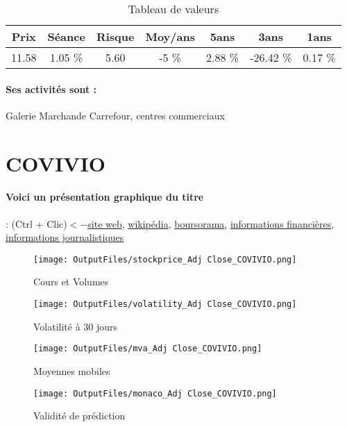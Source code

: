 \documentclass[11pt,a4paper]{report}%
\begin{document}
\begin{table}[H]
  \centering
    \begin{tabular}{|c|c|c|c|c|c|c|}
    \hline
    Prix & Séance & Risque  & Moy/ans & 5ans & 3ans & 1ans \\
    \hline
    11.58 &    1.05 \%    & 5.60 & -5 \% & 2.88 \% & -26.42 \% & 0.17 \% \\
    \hline
    \end{tabular}%
        \label{tab:table_CARMILA}%
      \caption{Tableau de valeurs}
\end{table}%

\paragraph{Ses activités sont : } Galerie Marchande Carrefour, centres commerciaux 
    
    \newpage

\section{COVIVIO}

\paragraph{Voici un présentation graphique du titre} : (Ctrl + Clic)$<-$\href{https://www.covivio.eu/fr/finance/investisseurs-et-actionnaires/}{site web}, \href{https://fr.wikipedia.org/wiki/Covivio}{wikipédia}, \href{https://www.boursorama.com/cours/1rPCOV}{boursorama}, \href{https://www.qwant.com/?q=site:https:%2f%2fwww.easybourse.com%2faction-societe%2fCOVIVIO&t=web&client=ext-firefox-hp}{informations financières}, \href{https://bourse.lerevenu.com/cours-de-bourse/fiche-valeur-synthese/COVIVIO/COV-FR}{informations journalistiques}
\begin{figure}[!htb]
   \begin{minipage}{0.5\textwidth}
     \centering
     \texttt{[image: OutputFiles/stockprice\_Adj Close\_COVIVIO.png]}
     \caption{Cours et Volumes}\label{Fig:price_COVIVIO}
   \end{minipage}\hfill
   \begin{minipage}{0.5\textwidth}
     \centering
     \texttt{[image: OutputFiles/volatility\_Adj Close\_COVIVIO.png]}
     \caption{Volatilité à 30 jours}\label{Fig:volat_COVIVIO}
   \end{minipage}
\end{figure}
\begin{figure}[!htb]
   \begin{minipage}{0.5\textwidth}
     \centering
     \texttt{[image: OutputFiles/mva\_Adj Close\_COVIVIO.png]}
     \caption{Moyennes mobiles}\label{Fig:mva_COVIVIO}
   \end{minipage}\hfill
   \begin{minipage}{0.5\textwidth}
     \centering
     \texttt{[image: OutputFiles/monaco\_Adj Close\_COVIVIO.png]}
     \caption{Validité de prédiction}\label{Fig:prediction_COVIVIO}
   \end{minipage}
\end{figure}
\end{document}
